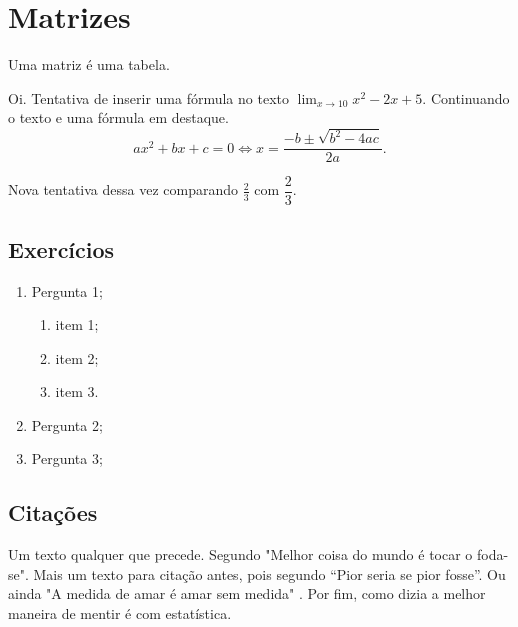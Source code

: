 \chapter{Matrizes}
\par Uma matriz é uma tabela. 


\par Oi. Tentativa de inserir uma fórmula no texto $\displaystyle \lim_{x\rightarrow 10} x^2-2x+5$. Continuando o texto e uma fórmula em destaque. $$ax^2+bx+c=0 \Leftrightarrow x=\frac{-b \pm \sqrt{b^2-4ac}}{2a}.$$

\par Nova tentativa dessa vez comparando $\frac{2}{3}$ com $\dfrac{2}{3}$.

\section{Exercícios}
\begin{enumerate}[label=\textbf{\arabic*}.]
    \item Pergunta 1;
    \begin{enumerate}[label=\alph*)]
        \item item 1;
        \item item 2;
        \item item 3.
    \end{enumerate}
    \item Pergunta 2;
    \item Pergunta 3;
\end{enumerate}

\section{Citações}
Um texto qualquer que precede. Segundo \citet[p. 19]{manson2017sutil} "Melhor coisa do mundo é tocar o foda-se". Mais um texto para citação antes, pois segundo \citet[p. 10]{fabiodantas} ``Pior seria se pior fosse''. Ou ainda "A medida de amar é amar sem medida" \citep[p. 12]{fabiodantas}. Por fim, como dizia \citet[p. 8]{huff2016mentir} a melhor maneira de mentir é com estatística.

